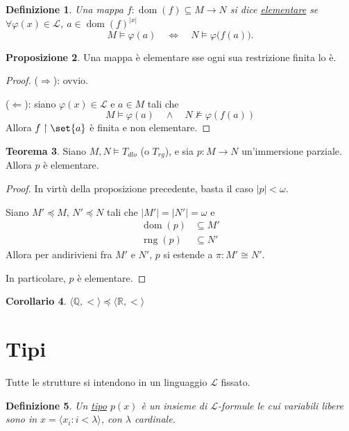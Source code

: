 \documentclass[10pt]{article}
\newcommand{\card}[1]{\left\vert #1 \right\vert}
\newcommand{\1}{\mathds{1}}
\newcommand{\R}{\mathds{R}}
\newcommand{\Q}{\mathds{Q}}
\theoremstyle{definition}%
\newtheorem{thm}{Teorema}[section]
\newtheorem{prop}[thm]{Proposizione}
\newtheorem{cor}[thm]{Corollario}
\theoremstyle{plain}
\newtheorem{definizione}[thm]{Definizione}
\theoremstyle{remark}
\begin{document}
\begin{definizione}
Una mappa \(f:\operatorname{dom}(f) \subseteq M\to N\) si dice \uline{elementare} se \(\forall \varphi(x) \in \mathcal{L}\), \(a \in \operatorname{dom}(f)^{|x|}\)
\begin{equation*}
M\vDash\varphi(a)\quad\iff\quad N\vDash\varphi\big(f(a)\big).
\end{equation*}
\end{definizione}

\begin{prop}
Una mappa è elementare sse ogni sua restrizione finita lo è.
\end{prop}
\begin{proof}
(\(\Rightarrow\)): ovvio.

(\(\Leftarrow\)): siano \(\varphi(x) \in \mathcal{L}\) e \(a \in M\) tali che
\begin{equation*}
M\vDash\varphi(a)\quad \land \quad N\not\vDash\varphi(f(a))
\end{equation*}
Allora \(f\upharpoonright \set{a}\) è finita e non elementare.
\end{proof}

\begin{thm}
Siano \(M,N\vDash T_{dlo}\) (o \(T_{rg}\)), e sia \(p:M\to N\) un'immersione parziale. Allora \(p\) è elementare.
\end{thm}
\begin{proof}
In virtù della proposizione precedente, basta il caso \(\card{p}<\omega\).

Siano \(M'\preceq M\), \(N'\preceq N\) tali che \(\card{M'}=\card{N'}=\omega\) e
\begin{align*}
\operatorname{dom}(p) &\subseteq M'\\
\operatorname{rng}(p) &\subseteq N'
\end{align*}
Allora per andirivieni fra \(M'\) e \(N'\), \(p\) si estende a \(\pi:M'\cong N'\).

In particolare, \(p\) è elementare.
\end{proof}
\begin{cor}
\(\langle \Q,<\rangle\preceq\langle \R,<\rangle\)
\end{cor}
\section{Tipi}
\label{sec:org9f3046d}

Tutte le strutture si intendono in un linguaggio \(\mathcal{L}\) fissato.

\begin{definizione}
Un \uline{tipo} \(p(x)\) è un insieme di \(\mathcal{L}\)-formule le cui variabili libere sono in \(x=\langle x_{i}:i<\lambda\rangle\), con \(\lambda\) cardinale.
\end{definizione}
\end{document}
